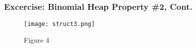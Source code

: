 \documentclass[13pt]{beamer}
\begin{document}
\begin{frame}
\frametitle{Excercise: Binomial Heap Property \#2, Cont.}

  \begin{figure}
        \caption{Figure 4}
        \texttt{[image: struct3.png]}
      \end{figure}

\end{frame}
\end{document}
